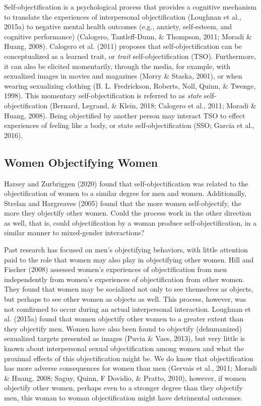 \documentclass[man]{apa6}
\begin{document}
Self-objectification is a psychological process that provides a
cognitive mechanism to translate the experiences of interpersonal
objectification (Loughnan et al., 2015a) to negative mental health
outcomes (e.g., anxiety, self-esteem, and cognitive performance)
(Calogero, Tantleff-Dunn, \& Thompson, 2011; Moradi \& Huang, 2008).
Calogero et al. (2011) proposes that self-objectification can be
conceptualized as a learned trait, or \emph{trait} self-objectification
(TSO). Furthermore, it can also be elicited momentarily, through the
media, for example, with sexualized images in movies and magazines
(Morry \& Staska, 2001), or when wearing sexualizing clothing (B. L.
Fredrickson, Roberts, Noll, Quinn, \& Twenge, 1998). This momentary
self-objectification is referred to as \emph{state} self-objectification
(Bernard, Legrand, \& Klein, 2018; Calogero et al., 2011; Moradi \&
Huang, 2008). Being objectified by another person may interact TSO to
effect experiences of feeling like a body, or state self-objectification
(SSO; Garcia et al., 2016).

\subsection{Women Objectifying Women}\label{women-objectifying-women}

Harsey and Zurbriggen (2020) found that self-objectification was related
to the objectification of women to a similar degree for men and women.
Additionally, Strelan and Hargreaves (2005) found that the more women
self-objectify, the more they objectify other women. Could the process
work in the other direction as well, that is, could objectification by a
woman produce self-objectification, in a similar manner to mixed-gender
interactions?

Past research has focused on men's objectifying behaviors, with little
attention paid to the role that women may also play in objectifying
other women. Hill and Fischer (2008) assessed women's experiences of
objectification from men independently from women's experiences of
objectification from other women. They found that women may be
socialized not only to see themselves as objects, but perhaps to see
other women as objects as well. This process, however, was not comfirmed
to occur during an actual interpersonal interaction. Loughnan et al.
(2015a) found that women objectify other women to a greater extent than
they objectify men. Women have also been found to objectify
(dehumanized) sexualized targets presented as images (Puvia \& Vaes,
2013), but very little is known about interpersonal sexual
objectification among women and what the proximal effects of this
objectification might be. We do know that objectification has more
adverse consequences for women than men (Gervais et al., 2011; Moradi \&
Huang, 2008; Saguy, Quinn, F Dovidio, \& Pratto, 2010), however, if
women objectify other women, perhaps even to a stronger degree than they
objectify men, this woman to woman objectification might have
detrimental outcomes.
\end{document}
